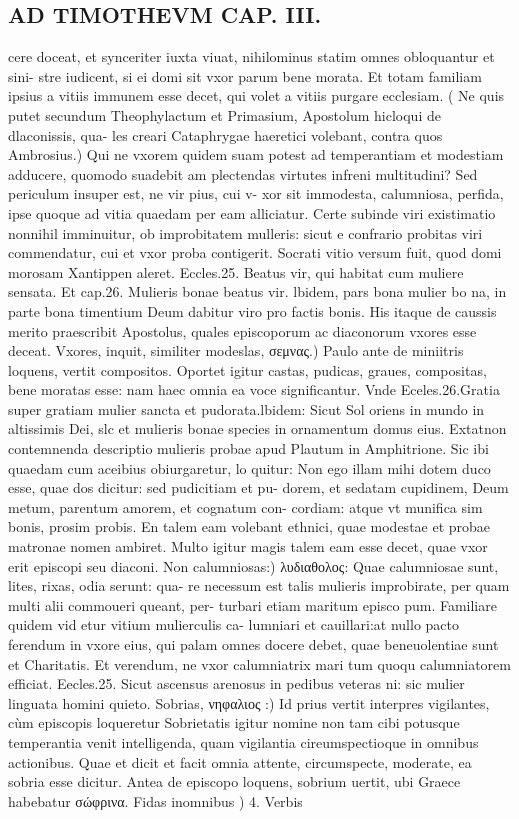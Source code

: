 \documentclass{article}
\begin{document}
\begin{pages}
\section*{AD TIMOTHEVM CAP. III. }
\marginpar{[ p.85 ]}\pstart cere doceat, et synceriter iuxta viuat, nihilominus statim omnes obloquantur et sini- stre iudicent, si ei domi sit vxor parum bene morata. Et totam familiam ipsius a vitiis immunem esse decet, qui volet a vitiis purgare ecclesiam. ( Ne quis putet secundum Theophylactum et Primasium, Apostolum hicloqui de dlaconissis, qua- les creari Cataphrygae haeretici volebant, contra quos Ambrosius.) Qui ne vxorem quidem suam potest ad temperantiam et modestiam adducere, quomodo suadebit am plectendas virtutes infreni multitudini? Sed periculum insuper est, ne vir pius, cui v- xor sit immodesta, calumniosa, perfida, ipse quoque ad vitia quaedam per eam alliciatur. Certe subinde viri existimatio nonnihil imminuitur, ob improbitatem mulleris: sicut e confrario probitas viri commendatur, cui et vxor proba contigerit. Socrati vitio versum fuit, quod domi morosam Xantippen aleret. Eccles.25. Beatus vir, qui habitat cum muliere sensata. Et cap.26. Mulieris bonae beatus vir. lbidem, pars bona mulier bo na, in parte bona timentium Deum dabitur viro pro factis bonis. His itaque de caussis merito praescribit Apostolus, quales episcoporum ac diaconorum vxores esse deceat.  \pend\pstart Vxores, inquit, similiter modeslas, σεμνας.) Paulo ante de miniitris loquens, vertit compositos. Oportet igitur castas, pudicas, graues, compositas, bene moratas esse: nam haec omnia ea voce significantur. Vnde Eceles.26.Gratia super gratiam mulier sancta et pudorata.lbidem: Sicut Sol oriens in mundo in altissimis Dei, slc et mulieris bonae species in ornamentum domus eius. Extatnon contemnenda descriptio mulieris probae apud Plautum in Amphitrione. Sic ibi quaedam cum aceibius obiurgaretur, lo quitur: Non ego illam mihi dotem duco esse, quae dos dicitur: sed pudicitiam et pu- dorem, et sedatam cupidinem, Deum metum, parentum amorem, et cognatum con- cordiam: atque vt munifica sim bonis, prosim probis. En talem eam volebant ethnici, quae modestae et probae matronae nomen ambiret. Multo igitur magis talem eam esse decet, quae vxor erit episcopi seu diaconi.  \pend\pstart Non calumniosas:) λυδιαθολος: Quae calumniosae sunt, lites, rixas, odia serunt: qua- re necessum est talis mulieris improbirate, per quam multi alii commoueri queant, per- turbari etiam maritum episco pum. Familiare quidem vid etur vitium mulierculis ca- lumniari et cauillari:at nullo pacto ferendum in vxore eius, qui palam omnes docere debet, quae beneuolentiae sunt et Charitatis. Et verendum, ne vxor calumniatrix mari tum quoqu calumniatorem efficiat. Eecles.25. Sicut ascensus arenosus in pedibus veteras ni: sic mulier linguata homini quieto.  \pend\pstart Sobrias, νηφαλιος :) Id prius vertit interpres vigilantes, cùm episcopis loqueretur Sobrietatis igitur nomine non tam cibi potusque temperantia venit intelligenda, quam vigilantia cireumspectioque in omnibus actionibus. Quae et dicit et facit omnia attente, circumspecte, moderate, ea sobria esse dicitur. Antea de episcopo loquens, sobrium uertit, ubi Graece habebatur σώφρινα.  \pend\pstart Fidas inomnibus ) 4. Verbis 
\end{pages}
\end{document}
